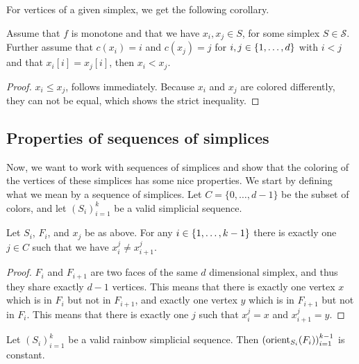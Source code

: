 For vertices of a given simplex, we get the following corollary.
\begin{corollary}
	\label{cor:monotone_coloring}
	Assume that $f$ is monotone and that we have $x_i, x_j \in S$, for some simplex $S\in \mathcal{S}$. Further assume that $c(x_i) = i$ and $c(x_j) = j$ for $i, j \in \left\{1, \dots, d\right\}$ with $i < j$ and that $x_i[i] = x_j[i]$, then $x_i < x_j$.
\end{corollary}
\begin{proof}
	$x_i \leq x_j$, follows immediately. Because $x_i$ and $x_j$ are colored differently, they can not be equal, which shows the strict inequality.
\end{proof}

\subsection{Properties of sequences of simplices}

Now, we want to work with sequences of simplices and show that the coloring of the vertices of these simplices has some nice properties. We start by defining what we mean by a sequence of simplices. Let $C = \{0, \dots, d-1\}$ be the subset of colors, and let $\left(S_i\right)_{i=1}^k$ be a valid simplicial sequence.
\begin{lemma}
	Let $S_i$, $F_i$, and $x_j$ be as above. For any $i \in \left\{1, \dots, k-1\right\}$ there is exactly one $j \in C$ such that we have $x_i^j \neq x_{i+1}^j$.
\end{lemma}
\begin{proof}
	$F_i$ and $F_{i+1}$ are two faces of the same $d$ dimensional simplex, and thus they share exactly $d-1$ vertices. This means that there is exactly one vertex $x$ which is in $F_i$ but not in $F_{i+1}$, and exactly one vertex $y$ which is in $F_{i+1}$ but not in $F_i$. This means that there is exactly one $j$ such that $x_i^j = x$ and $x_{i+1}^j = y$.
\end{proof}

\begin{lemma}
	\label{lem:consistent_orientation_of_transition_faces}
	Let $\left(S_i\right)_{i=1}^{k}$ be a valid rainbow simplicial sequence. Then $\left(\operatorname{orient}_{S_i}(F_i)\right)_{i=1}^{k-1}$ is constant.
\end{lemma}

